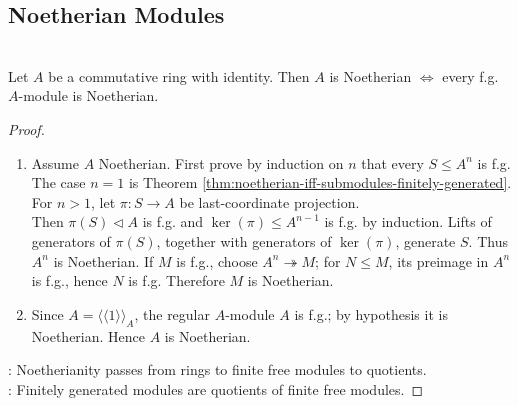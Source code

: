 \subsection{Noetherian Modules}

\begin{theorem} \label{thm:finitely-generated-modules-over-noetherian-rings} \\
Let $A$ be a commutative ring with identity. Then $A$ is Noetherian $\Longleftrightarrow$ every f.g. $A$-module is Noetherian.
\begin{proof}
\begin{enumerate}[label=\roman*.]
\setlength{\itemsep}{0pt}
\item[$(\Rightarrow)$] Assume $A$ Noetherian. First prove by induction on $n$ that every $S\leq A^n$ is f.g.\\
The case $n=1$ is Theorem \ref{thm:noetherian-iff-submodules-finitely-generated}. For $n>1$, let $\pi:S\to A$ be last-coordinate projection.\\
Then $\pi(S)\lhd A$ is f.g. and $\ker(\pi)\leq A^{n-1}$ is f.g. by induction. Lifts of generators of $\pi(S)$, together with generators of $\ker(\pi)$, generate $S$. Thus $A^n$ is Noetherian. If $M$ is f.g., choose $A^n\twoheadrightarrow M$; for $N\leq M$, its preimage in $A^n$ is f.g., hence $N$ is f.g. Therefore $M$ is Noetherian.
\item[$(\Leftarrow)$] Since $A=\langle\!\langle1\rangle\!\rangle_A$, the regular $A$-module $A$ is f.g.; by hypothesis it is Noetherian. Hence $A$ is Noetherian.
\end{enumerate}
\noindent
{}: Noetherianity passes from rings to finite free modules to quotients.\\
: Finitely generated modules are quotients of finite free modules.
\end{proof}
\end{theorem}
